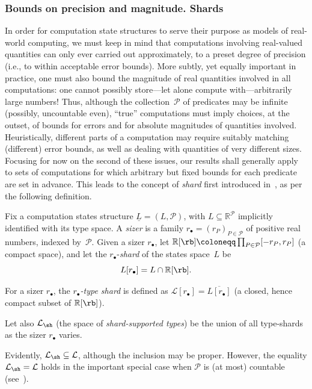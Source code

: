 \subsubsection{Bounds on precision and magnitude. Shards}
\label{sec:shards}

In order for computation state structures to serve their purpose as models of real-world computing, we must keep in mind that computations involving real-valued quantities can only ever carried out approximately, to a preset degree of precision (i.e., to within acceptable error bounds).
More subtly, yet equally important in practice, one must also bound the magnitude of real quantities involved in all computations:
one cannot possibly store—let alone compute with—arbitrarily large numbers!
Thus, although the collection~$\mathcal{P}$ of predicates may be infinite (possibly, uncountable even), “true” computations must imply choices, at the outset, of bounds for errors and for absolute magnitudes of quantities involved.
Heuristically, different parts of a computation may require suitably matching (different) error bounds, as well as dealing with quantities of very different sizes.
Focusing for now on the second of these issues, our results shall generally apply to sets of computations for which arbitrary but fixed bounds for each predicate are set in advance.
This leads to the concept of \emph{shard} first introduced in~\cite{alva2024approximability}, as per the following definition.

\begin{definition}
    Fix a computation states structure $\underline{L} = (L, \mathcal{P})$, with $L\subseteq \mathbb{R}^{\mathcal{P}}$ implicitly identified with its type space.
    A \emph{sizer} is a family $r_{\bullet}=(r_P)_{P\in\mathcal{P}}$ of positive real numbers, indexed by~$\mathcal{P}$.
    Given a sizer $r_\bullet$, let $\mathbb{R}[\rb] \coloneqq \prod_{P\in\mathcal{P}}[-r_P,r_P]$ (a compact space), and let the $r_\bullet$-\emph{shard} of the states space~$L$ be $$L[r_\bullet] = L\cap \mathbb{R}[\rb].$$

For a sizer $r_{\bullet}$, the \emph{$r_{\bullet}$-type shard} is defined as $\mathcal{L}[r_\bullet]=\overline{L[r_\bullet]}$
(a closed, hence compact subset of $\mathbb{R}[\rb]$).

Let also $\mathcal{L}_{\sh}$ (the space of \emph{shard-supported types}) be the union of all type-shards as the sizer $r_{\bullet}$ varies.
\end{definition}

Evidently, $\mathcal{L}_{\sh}\subseteq \mathcal{L}$, although the inclusion may be proper.
However, the equality $\mathcal{L}_{\sh} = \mathcal{L}$ holds in the important special case when $\mathcal{P}$ is (at most) countable (see~\cite{alva2024approximability}).

